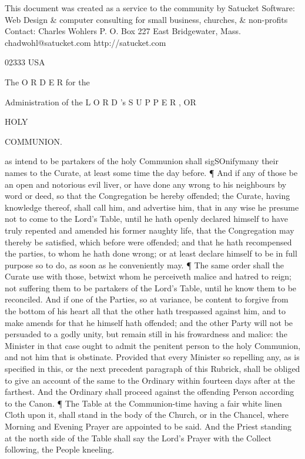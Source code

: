 This document was created as a service to the community by Satucket Software: Web Design \& computer consulting for small business, churches, \& non-profits Contact: Charles Wohlers P. O. Box 227 East Bridgewater, Mass. chadwohl@satucket.com http://satucket.com

02333 USA

The O R D E R for the

Administration of the L O R D ’s S U P P E R , OR

HOLY

COMMUNION.

as intend to be partakers of the holy Communion shall sigSOnifymany their names to the Curate, at least some time the day before. ¶ And if any of those be an open and notorious evil liver, or have done any wrong to his neighbours by word or deed, so that the Congregation be hereby offended; the Curate, having knowledge thereof, shall call him, and advertise him, that in any wise he presume not to come to the Lord’s Table, until he hath openly declared himself to have truly repented and amended his former naughty life, that the Congregation may thereby be satisfied, which before were offended; and that he hath recompensed the parties, to whom he hath done wrong; or at least declare himself to be in full purpose so to do, as soon as he conveniently may. ¶ The same order shall the Curate use with those, betwixt whom he perceiveth malice and hatred to reign; not suffering them to be partakers of the Lord’s Table, until he know them to be reconciled. And if one of the Parties, so at variance, be content to forgive from the bottom of his heart all that the other hath trespassed against him, and to make amends for that he himself hath offended; and the other Party will not be persuaded to a godly unity, but remain still in his frowardness and malice: the Minister in that case ought to admit the penitent person to the holy Communion, and not him that is obstinate. Provided that every Minister so repelling any, as is specified in this, or the next precedent paragraph of this Rubrick, shall be obliged to give an account of the same to the Ordinary within fourteen days after at the farthest. And the Ordinary shall proceed against the offending Person according to the Canon. ¶ The Table at the Communion-time having a fair white linen Cloth upon it, shall stand in the body of the Church, or in the Chancel, where Morning and Evening Prayer are appointed to be said. And the Priest standing at the north side of the Table shall say the Lord’s Prayer with the Collect following, the People kneeling.

